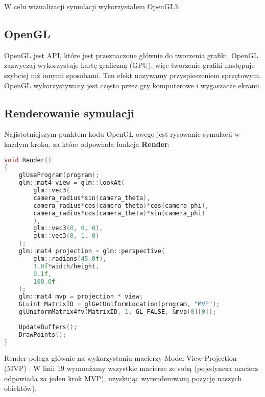 \documentclass[14pt,twoside,a4paper]{article}
\theoremstyle{definition}
\begin{document}
W celu wizualizacji symulacji wykorzystałem OpenGL3. 

\subsection{\large OpenGL}
OpenGL \cite{opengl} jest API, które jest przeznaczone głównie do tworzenia grafiki. OpenGL zazwyczaj wykorzystuje kartę graficzną (GPU), więc tworzenie grafiki następuje szybciej niż innymi sposobami. Ten efekt nazywamy przyspieszeniem sprzętowym. OpenGL wykorzystywany jest często przez gry komputerowe i wygaszacze ekranu.

\subsection{\large Renderowanie symulacji}

Najistotniejszym punktem kodu OpenGL-owego jest rysowanie symulacji w każdym kroku, za które odpowiada funkcja \textbf{Render}:
\begin{lstlisting}[language=C++, frame=single, framerule=2pt, caption=Pseudokod renderowania symulacji]
void Render() 
{
    glUseProgram(program);
    glm::mat4 view = glm::lookAt(
        glm::vec3(
        camera_radius*sin(camera_theta),
        camera_radius*cos(camera_theta)*cos(camera_phi),
        camera_radius*cos(camera_theta)*sin(camera_phi)
        ),
        glm::vec3(0, 0, 0),
        glm::vec3(0, 1, 0)
    );
    glm::mat4 projection = glm::perspective(
        glm::radians(45.0f),
        1.0f*width/height,
        0.1f,
        100.0f
    );
    glm::mat4 mvp = projection * view;
    GLuint MatrixID = glGetUniformLocation(program, "MVP");
    glUniformMatrix4fv(MatrixID, 1, GL_FALSE, &mvp[0][0]);
    
    UpdateBuffers();
    DrawPoints();
}
\end{lstlisting}
\bigskip

Render polega głównie na wykorzystaniu macierzy Model-View-Projection (MVP) \cite{tutMat}. 
W linii 19 wymnażamy wszystkie macierze ze sobą (pojedyncza macierz odpowiada za jeden krok MVP), uzyskując wyrenderowaną pozycję naszych obiektów).\\
\end{document}
